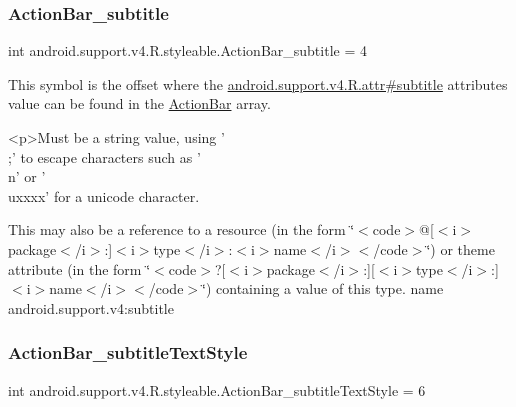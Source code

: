 \subsubsection{\texorpdfstring{Action\+Bar\+\_\+subtitle}{ActionBar\_subtitle}}
{\footnotesize\ttfamily int android.\+support.\+v4.\+R.\+styleable.\+Action\+Bar\+\_\+subtitle = 4\hspace{0.3cm}{\ttfamily [static]}}

This symbol is the offset where the \hyperlink{classandroid_1_1support_1_1v4_1_1R_1_1attr_a6a1cb8c7505d353bab12b766346b0219}{android.\+support.\+v4.\+R.\+attr\#subtitle} attribute\textquotesingle{}s value can be found in the \hyperlink{classandroid_1_1support_1_1v4_1_1R_1_1styleable_adc5a3492b9c46265760d7120a04d6afa}{Action\+Bar} array.

\begin{DoxyVerb}      <p>Must be a string value, using '\\;' to escape characters such as '\\n' or '\\uxxxx' for a unicode character.
\end{DoxyVerb}
 

This may also be a reference to a resource (in the form \char`\"{}$<$code$>$@\mbox{[}$<$i$>$package$<$/i$>$\+:\mbox{]}$<$i$>$type$<$/i$>$\+:$<$i$>$name$<$/i$>$$<$/code$>$\char`\"{}) or theme attribute (in the form \char`\"{}$<$code$>$?\mbox{[}$<$i$>$package$<$/i$>$\+:\mbox{]}\mbox{[}$<$i$>$type$<$/i$>$\+:\mbox{]}$<$i$>$name$<$/i$>$$<$/code$>$\char`\"{}) containing a value of this type.  name android.\+support.\+v4\+:subtitle \mbox{\label{classandroid_1_1support_1_1v4_1_1R_1_1styleable_abd6b087231fbace7aa513febebda8b29}} 
\subsubsection{\texorpdfstring{Action\+Bar\+\_\+subtitle\+Text\+Style}{ActionBar\_subtitleTextStyle}}
{\footnotesize\ttfamily int android.\+support.\+v4.\+R.\+styleable.\+Action\+Bar\+\_\+subtitle\+Text\+Style = 6\hspace{0.3cm}{\ttfamily [static]}}

